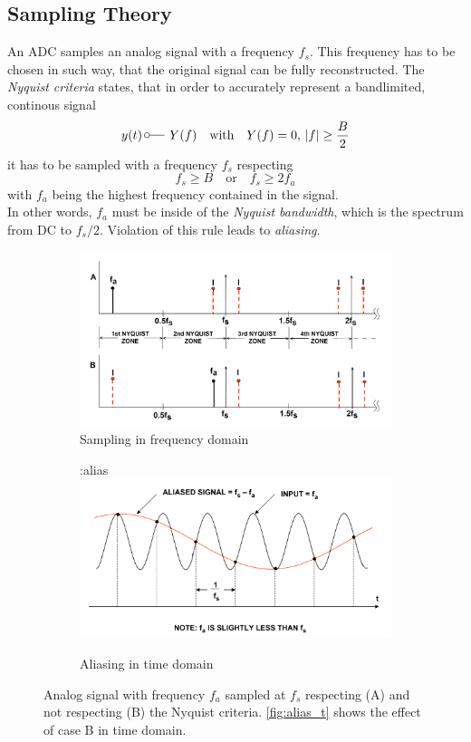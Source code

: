 \subsection{Sampling Theory}
An ADC samples an analog signal with a frequency $f_s$. This frequency has to be chosen in such way, that the original signal can be fully reconstructed. The \textit{Nyquist criteria} states, that in order to accurately represent a bandlimited, continous signal
\begin{equation}
	y (t) \, \fourier  Y(f) \quad \text{with} \quad Y(f) = 0, \, |f| \geq \frac{B}{2}
\end{equation}
it has to be sampled with a frequency $f_s$ respecting
\begin{equation}
	f_s \geq B \quad \text{or} \quad f_s \geq 2 f_a
\end{equation}
with $f_a$ being the highest frequency contained in the signal. \cite{walt} \cite{puente2015} \\
In other words, $f_a$ must be inside of the \textit{Nyquist bandwidth}, which is the spectrum from DC to $f_s/2$. Violation of this rule leads to \textit{aliasing}.

\begin{figure}[H]
	\centering
	\begin{subfigure}{\textwidth}
	\centering
	\includegraphics[width=.6\linewidth]{chap/02-theory/img/alias_f}  
	\caption{Sampling in frequency domain}
	\label{fig:alias_f}
	\end{subfigure}
	\begin{subfigure}{\textwidth}
	\centering
:alias	\includegraphics[width=.6\linewidth]{chap/02-theory/img/alias_t}  
	\caption{Aliasing in time domain}
	\label{fig:alias_t}
	\end{subfigure}
	\caption{Analog signal with frequency $f_a$ sampled at $f_s$ respecting (A) and not respecting (B) the Nyquist criteria. \autoref{fig:alias_t} shows the effect of case B in time domain. \cite{walt}}
\end{figure}


